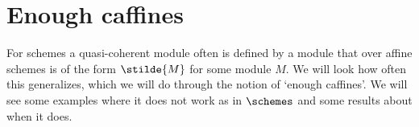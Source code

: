 \section{Enough caffines}
For schemes a quasi-coherent module often is defined
by a module that over affine schemes is of the form $\stilde{M}$
for some module $M$. We will look how often this generalizes,
which we will do through the notion of `enough caffines'.
We will see some examples where it does not work as in $\schemes$ 
and some results about when it does.












%